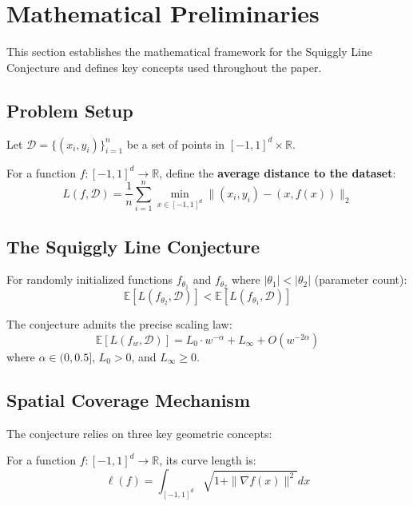 \section{Mathematical Preliminaries}
\label{sec:preliminaries}

This section establishes the mathematical framework for the Squiggly Line Conjecture and defines key concepts used throughout the paper.

\subsection{Problem Setup}

Let $\mathcal{D} = \{(x_i, y_i)\}_{i=1}^n$ be a set of points in $[-1, 1]^d \times \mathbb{R}$.

For a function $f: [-1, 1]^d \to \mathbb{R}$, define the \textbf{average distance to the dataset}:
$$L(f, \mathcal{D}) = \frac{1}{n} \sum_{i=1}^n \min_{x \in [-1,1]^d} \|(x_i, y_i) - (x, f(x))\|_2$$

\subsection{The Squiggly Line Conjecture}

\begin{definition}
For randomly initialized functions $f_{\theta_1}$ and $f_{\theta_2}$ where $|\theta_1| < |\theta_2|$ (parameter count):
$$\mathbb{E}[L(f_{\theta_2}, \mathcal{D})] < \mathbb{E}[L(f_{\theta_1}, \mathcal{D})]$$
\end{definition}

\begin{definition}
The conjecture admits the precise scaling law:
$$\mathbb{E}[L(f_w, \mathcal{D})] = L_0 \cdot w^{-\alpha} + L_\infty + O(w^{-2\alpha})$$
where $\alpha \in (0, 0.5]$, $L_0 > 0$, and $L_\infty \geq 0$.
\end{definition}

\subsection{Spatial Coverage Mechanism}

The conjecture relies on three key geometric concepts:

\begin{definition}
For a function $f: [-1,1]^d \to \mathbb{R}$, its curve length is:
$$\ell(f) = \int_{[-1,1]^d} \sqrt{1 + \|\nabla f(x)\|^2} dx$$
\end{definition}

